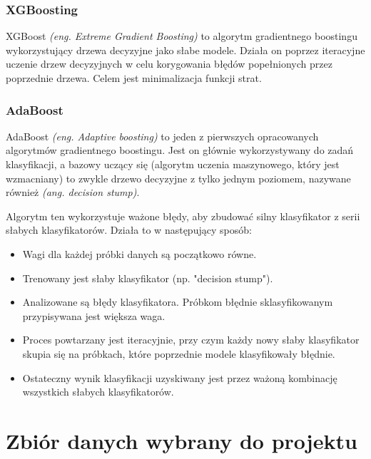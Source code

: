 \documentclass[12pt,a4paper]{article}
\begin{document}
\subsubsection{XGBoosting}
\label{sec:xgboosting}
XGBoost \textit{(eng. Extreme Gradient Boosting)} \cite{xg-boost} to algorytm gradientnego boostingu wykorzystujący drzewa decyzyjne jako słabe modele. Działa on poprzez iteracyjne uczenie drzew decyzyjnych w celu korygowania błędów popełnionych przez poprzednie drzewa. Celem jest minimalizacja funkcji strat.

\subsubsection{AdaBoost}
\label{sec:adaboosting}
AdaBoost \textit{(eng. Adaptive boosting)} to jeden z pierwszych opracowanych algorytmów gradientnego boostingu. Jest on głównie wykorzystywany do zadań klasyfikacji, a bazowy uczący się (algorytm uczenia maszynowego, który jest wzmacniany) to zwykle drzewo decyzyjne z tylko jednym poziomem, nazywane również \textit{(ang. decision stump)}. \cite{adaboost}

Algorytm ten wykorzystuje ważone błędy, aby zbudować silny klasyfikator z serii słabych klasyfikatorów. Działa to w następujący sposób:
\begin{itemize}
    \item Wagi dla każdej próbki danych są początkowo równe.
    \item Trenowany jest słaby klasyfikator (np. "decision stump").
    \item Analizowane są błędy klasyfikatora. Próbkom błędnie sklasyfikowanym przypisywana jest większa waga.
    \item Proces powtarzany jest iteracyjnie, przy czym każdy nowy słaby klasyfikator skupia się na próbkach, które poprzednie modele klasyfikowały błędnie.
    \item Ostateczny wynik klasyfikacji uzyskiwany jest przez ważoną kombinację wszystkich słabych klasyfikatorów.
\end{itemize}



\section{Zbiór danych wybrany do projektu}
\end{document}
